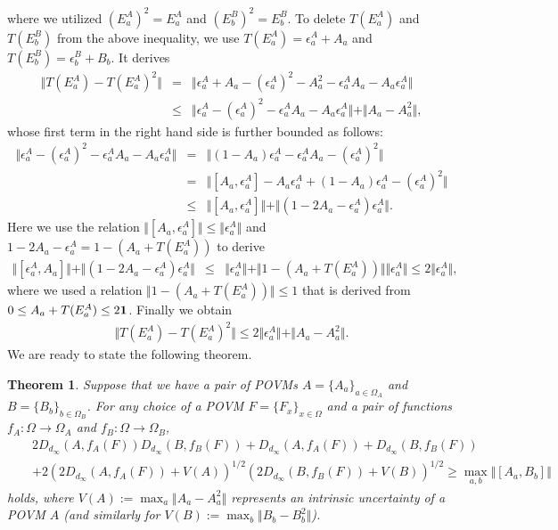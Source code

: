 \documentclass[showpacs,preprintnumbers,amsmath,amssymb]{revtex4}
\newtheorem{theorem}{Theorem}
\begin{document}
where we utilized $(E^A_a)^2=E^A_a$ and $(E^B_b)^2 =E^B_b$. 
To delete $T(E^A_a)$ and $T(E^B_b)$ from the above inequality, we use
$T(E^A_a)=\epsilon^A_a +A_a$ and $T(E^B_b)=\epsilon^B_b +B_b$. 
It derives
\begin{eqnarray*}
\Vert T(E^A_a)-T(E^A_a)^2 \Vert 
&=&\Vert \epsilon^A_a +A_a -(\epsilon^A_a)^2 -A_a^2
-\epsilon^A_a A_a -A_a \epsilon^A_a
\Vert
\\
&\leq&
\Vert \epsilon^A_a -(\epsilon^A_a)^2 -\epsilon^A_a A_a -A_a \epsilon^A_a 
\Vert 
+ \Vert A_a -A_a^2\Vert,
\end{eqnarray*}
whose first term in the right hand side 
is further bounded as follows:
\begin{eqnarray*}
\Vert \epsilon^A_a -(\epsilon^A_a)^2 -\epsilon^A_a A_a -A_a \epsilon^A_a 
\Vert 
&=&
\Vert (1-A_a)\epsilon^A_a -\epsilon^A_a A_a -(\epsilon^A_a)^2\Vert
\\
&=&
\Vert [A_a, \epsilon^A_a] -A_a \epsilon^A_a + (1-A_a)\epsilon^A_a -
(\epsilon^A_a)^2\Vert 
\\
&\leq &
\Vert [A_a,\epsilon^A_a]\Vert 
+\Vert (1-2A_a -\epsilon^A_a) \epsilon^A_a\Vert.
\end{eqnarray*}
Here we use the relation $\Vert [A_a, \epsilon^A_a]\Vert 
\leq \Vert \epsilon^A_a\Vert$ and $1-2A_a -\epsilon^A_a
=1-(A_a +T(E^A_a))$ to derive
\begin{eqnarray*}
\Vert [\epsilon^A_a, A_a]\Vert 
+\Vert (1-2A_a -\epsilon^A_a) \epsilon^A_a\Vert
&\leq& \Vert \epsilon^A_a \Vert 
+\Vert 1-(A_a +T(E^A_a))\Vert \Vert \epsilon^A_a\Vert
\leq
2 \Vert \epsilon^A_a\Vert, 
\end{eqnarray*}
where we used a relation $\Vert 1- (A_a +T(E^A_a))\Vert \leq 1$
that is derived from $0\leq A_a +T(E^A_a)\leq 2 {\bf 1}$.
Finally we obtain
\begin{eqnarray}
\Vert T(E^A_a)-T(E^A_a)^2 \Vert
\leq 2\Vert \epsilon^A_a\Vert +\Vert A_a-A_a^2\Vert.
\label{TAbound}
\end{eqnarray}
We are ready to state the following theorem.
\begin{theorem}\label{maintheorem}
Suppose that we have a pair of POVMs $A=\{A_a\}_{a\in \Omega_A}$ 
and $B=\{B_b\}_{b\in \Omega_B}$. For any choice of a POVM 
$F=\{F_x\}_{x\in \Omega}$ and a pair of functions 
$f_A: \Omega \to \Omega_A$ and $f_B: \Omega \to \Omega_B$, 
\begin{eqnarray*}
&&2 D_{d_{\infty}}(A, f_A(F))D_{d_{\infty}}(B, f_B(F))
+D_{d_{\infty}}(A,f_A(F))+D_{d_{\infty}}(B,f_B(F))
\\
&&
+2 (2D_{d_{\infty}}(A,f_A(F))+ V(A))^{1/2}(2D_{d_{\infty}}(B,f_B(F))
+V(B))^{1/2}\geq \max_{a,b}\Vert[A_a,B_b]\Vert
\end{eqnarray*}
holds, where $V(A):=\max_a\Vert A_a-A_a^2\Vert$ represents 
an intrinsic uncertainty of a POVM $A$ (and similarly for $V(B):=
\max_b \Vert B_b -B_b^2\Vert$). 
\end{theorem}
\end{document}
